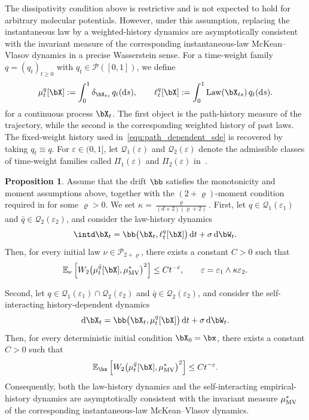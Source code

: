 \documentclass[a4paper,fleqn]{cas-sc}
\theoremstyle{definition}
\newtheorem{proposition}[theorem]{Proposition}
\begin{document}
The dissipativity condition above is restrictive and is not expected to hold for arbitrary molecular potentials. However, under this assumption, replacing the
instantaneous law by a weighted-history dynamics are asymptotically consistent with the invariant measure 
of the corresponding instantaneous-law McKean--Vlasov dynamics in a precise Wasserstein sense.
For a time-weight family $q=(q_t)_{t\ge0}$ with
$q_t\in\mathcal P([0,1])$, we define
\[
    \mu_t^q[\bX]
    :=
    \int_0^1 \delta_{\bX_{ts}}\,q_t({\rm d}s),
    \qquad
    \ell_t^q[\bX]
    :=
    \int_0^1 {\rm Law}(\bX_{ts})\,q_t({\rm d}s).
\]
for a continuous process $\bX_t$.
The first object is the path-history measure of the trajectory, while the
second is the corresponding weighted history of past laws. The fixed-weight history used in~\eqref{equ:path_dependent_sde} is recovered by taking
$q_t\equiv q$.
For $\varepsilon\in(0,1]$, let $\mathcal Q_1(\varepsilon)$ and
$\mathcal Q_2(\varepsilon)$ denote the admissible classes of time-weight families
called $\Pi_1(\varepsilon)$ and $\Pi_2(\varepsilon)$ in~\cite{du2023empirical}.


\begin{proposition}
\label{prop:history_consistency}
Assume that the drift $\bb$ satisfies the monotonicity and moment assumptions
above, together with the $(2+\varrho)$-moment condition required in
\cite{du2023empirical} for some $\varrho>0$. We set
$\kappa=\frac{\varrho}{(d+2)(\varrho+2)}.
$
%
First, let $q\in\mathcal Q_1(\varepsilon_1)$ and
$\bar q\in\mathcal Q_2(\varepsilon_2)$, and consider the law-history dynamics
\[
    \intd \bX_t
    =
    \bb\bigl(\bX_t,\ell_t^q[\bX]\bigr)\,{\rm d}t
    +
    \sigma\,{\rm d}\bW_t .
\]
Then, for every initial law $\nu\in\mathcal P_{2+\varrho}$, there exists a
constant $C>0$ such that
\[
    \mathbb E_\nu
    \left[
        W_2\!\left(\mu_t^{\bar q}[\bX],\mu_{\rm MV}^*\right)^2
    \right]
    \le
    C t^{-\varepsilon},
    \qquad
    \varepsilon
    =
    \varepsilon_1\wedge \kappa\varepsilon_2 .
\]

Second, let
$q\in\mathcal Q_1(\varepsilon_1)\cap\mathcal Q_2(\varepsilon_2)$ and
$\bar q\in\mathcal Q_2(\varepsilon_2)$, and consider the self-interacting
history-dependent dynamics
\[
    {\rm d}\bX_t
    =
    \bb\bigl(\bX_t,\mu_t^q[\bX]\bigr)\,{\rm d}t
    +
    \sigma\,{\rm d}\bW_t .
\]
Then, for every deterministic initial condition \(\bX_0=\bx\), there exists a
constant $C>0$ such that
\[
    \mathbb E_{\bx}
    \left[
        W_2\!\left(\mu_t^{\bar q}[\bX],\mu_{\rm MV}^*\right)^2
    \right]
    \le
    C t^{-\varepsilon}.
\]
Consequently, both the law-history dynamics and the self-interacting
empirical-history dynamics are asymptotically consistent with the invariant
measure $\mu_{\rm MV}^*$ of the corresponding instantaneous-law McKean--Vlasov
dynamics.
\end{proposition}
\end{document}
